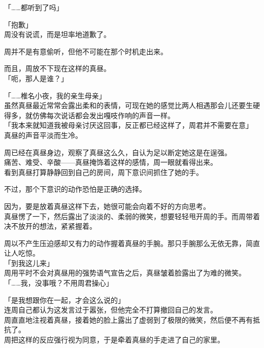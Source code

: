 「……都听到了吗」

「抱歉」\\

周没有说谎，而是坦率地道歉了。

周并不是有意偷听，但他不可能在那个时机走出来。

而且，周放不下现在这样的真昼。\\

「呃，那人是谁？」

「……椎名小夜，我的亲生母亲」\\

虽然真昼最近常常会露出柔和的表情，可现在她的感觉比两人相遇那会儿还要生硬得多，就仿佛每次说话都会发出嘎吱作响的声音一样。\\

「我本来就知道我被母亲讨厌这回事，反正都已经这样了，周君并不需要在意」\\

真昼的声音平淡而生冷。

周已经在真昼身边，观察了真昼这么久，自认为足以断定她这是在逞强。\\

痛苦、难受、辛酸——真昼掩饰着这样的感情，周一眼就看得出来。\\

看到真昼打算静静回到自己的房间，周下意识间抓住了她的手。

不过，那个下意识的动作恐怕是正确的选择。

因为，要是放着真昼这样下去，她很可能会向着不好的方向思考。\\

真昼愣了一下，然后露出了淡淡的、柔弱的微笑，想要轻轻甩开周的手。而周带着决不放开的想法，紧紧握着。

周以不产生压迫感却又有力的动作握着真昼的手腕。那只手腕那么无依无靠，简直让人吃惊。\\

「到我这儿来」\\

周用平时不会对真昼用的强势语气宣告之后，真昼皱着脸露出了为难的微笑。\\

「……我，没事哦？不用周君操心」

「是我想跟你在一起，才会这么说的」\\

连周自己都认为这发言过于嚣张，但他完全不打算撤回自己的发言。\\

周直直地注视着真昼，接着她的脸上露出了虚弱到了极限的微笑，然后便不再有抵抗了。\\

周把这样的反应强行视为同意，于是牵着真昼的手走进了自己的家里。
